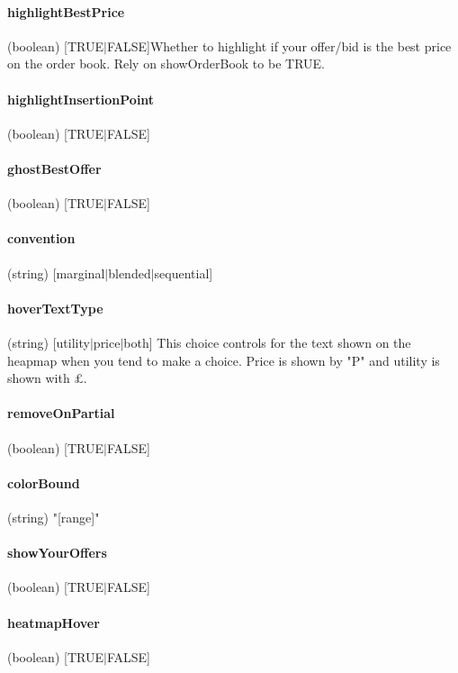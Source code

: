 \documentclass[12pt]{article}
\begin{document}
\paragraph{highlightBestPrice} (boolean) [TRUE$|$FALSE]Whether to highlight if your offer/bid is the best price on the order book. Rely on showOrderBook to be TRUE.

{\color{red} \paragraph{highlightInsertionPoint} (boolean) [TRUE$|$FALSE] }
{\color{red} \paragraph{ghostBestOffer} (boolean) [TRUE$|$FALSE]}
{\color{red} \paragraph{convention} (string) [marginal$|$blended$|$sequential] }

\paragraph{hoverTextType} (string) [utility$|$price$|$both] This choice controls for the text shown on the heapmap when you tend to make a choice. Price is shown by "P" and utility is shown with $\pounds$.

{\color{red}
\paragraph{removeOnPartial} (boolean) [TRUE$|$FALSE]	
\paragraph{colorBound} (string) "[range]"
\paragraph{showYourOffers} (boolean) [TRUE$|$FALSE]
\paragraph{heatmapHover} (boolean) [TRUE$|$FALSE]	}								
\end{document}
